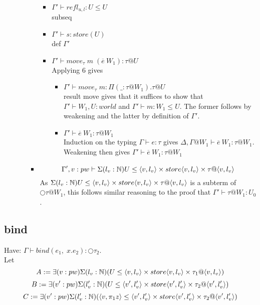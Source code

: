 \documentclass{article}
\begin{document}
\begin{itemize}
\begin{itemize}
\begin{itemize}
                 \begin{itemize}
                     \item $\Gamma' \vdash refl_{u, l} : U \leq U$\\
                     subseq
                     \item $\Gamma' \vdash s: store(U)$\\
                     def $\Gamma'$
                     \item $\Gamma' \vdash move_{\tau}\;m\;(\overline{e} \: W_1) : \tau @ U$\\
                     Applying 6 gives 
                     \begin{itemize}
                         \item $\Gamma' \vdash move_{\tau}\;m : \Pi(\_ : \tau @ W_1). \tau @ U$\\
                         result move gives that it suffices to show that $\Gamma' \vdash W_1, U : world$ and $\Gamma' \vdash m : W_1 \leq U$. The former follows by weakening and the latter by definition of $\Gamma'$.
                         \item $\Gamma' \vdash \overline{e} \: W_1 : \tau @ W_1$\\
                         Induction on the typing $\Gamma \vdash e : \tau$ gives $\Delta, \Gamma @ W_1 \vdash  \overline{e} \: W_1 : \tau @ W_1$. Weakening then gives $\Gamma' \vdash \overline{e} \: W_1 : \tau @ W_1$
                     \end{itemize}
                 \end{itemize}
          \item  \[\Gamma', v: pw \vdash \Sigma(l_v : \N)U \leq \langle v, l_v\rangle \times store\langle v, l_v\rangle \times \tau@\langle v, l_v\rangle\]
          As $\Sigma(l_v : \N)U \leq \langle v, l_v\rangle \times store\langle v, l_v\rangle \times \tau@\langle v, l_v\rangle$ is a subterm of $\bigcirc \tau @ W_1$, this follows similar reasoning to the proof that $\Gamma ' \vdash \tau @ W_1 : U_0$.
         \end{itemize}
     \end{itemize}
\end{itemize}

\subsection{bind}
Have: $\Gamma \vdash bind(e_1,\; x.e_2) : \bigcirc \tau_2$. \\
Let
\[A :=\exists(v: pw)\Sigma(l_v : \mathbb{N})(U \leq \langle v, l_v \rangle \times store\langle v, l_v \rangle \times \tau_1 @ \langle v, l_v \rangle)
\]
\[B :=\exists(v': pw)\Sigma(l_v' : \mathbb{N})(U \leq \langle v', l_v' \rangle \times store\langle v', l_v' \rangle \times \tau_2 @ \langle v', l_v' \rangle)
\]
\[C :=\exists(v': pw)\Sigma(l_v' : \mathbb{N})(\langle v, \pi_1 z \rangle \leq \langle v', l_v' \rangle \times store\langle v', l_v' \rangle \times \tau_2 @ \langle v', l_v' \rangle)
\]
\end{document}
